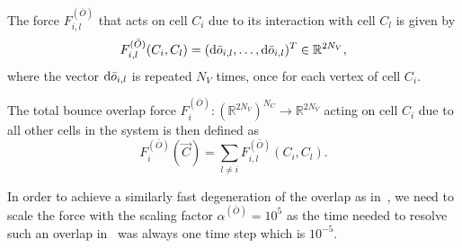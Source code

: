 \begin{definition}
	The force $F^{(\bar{O})}_{i,l}$ that acts on cell $C_i$ due to its interaction with cell $C_l$ is given by
	\[
	F^{(\bar{O})}_{i,l}(C_i, C_l) =  (\mathrm{d} \bar{o}_{i,l}, \ldots, \mathrm{d} \bar{o}_{i,l})^T \in \mathbb{R}^{2N_V},
	\]
	where the vector $\mathrm{d} \bar{o}_{i,l}$ is repeated $N_V$ times, once for each vertex of cell $C_i$.

	The total bounce overlap force $F^{(\bar{O})}_i: (\mathbb{R}^{2N_V})^{N_C} \rightarrow \mathbb{R}^{2N_V}$ acting on cell $C_i$ due to all other cells in the system is then defined as
	\[
	F^{(\bar{O})}_i(\vec{C}) = \sum\limits_{l \neq i} F^{(\bar{O})}_{i,l}(C_i, C_l).
	\]

\end{definition}
In order to achieve a similarly fast degeneration of the overlap as in~\cite{Bruna2012}, we need to scale the force with the scaling factor 
\(
\alpha^{(\bar{O})} = 10^5
\)
as the time needed to resolve such an overlap in~\cite{Bruna2012} was always one time step which is $10^{-5}$. 



